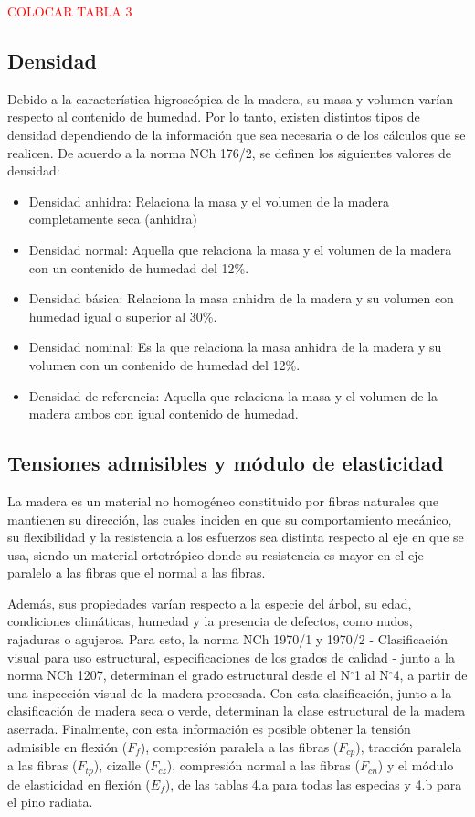 \textcolor{red}{COLOCAR TABLA 3}\\

\subsection{Densidad}
Debido a la característica higroscópica de la madera, su masa y volumen varían respecto al contenido de humedad. Por lo tanto, existen distintos tipos de densidad dependiendo de la información que sea necesaria o de los cálculos que se realicen. De acuerdo a la norma NCh 176/2, se definen los siguientes valores de densidad:
\begin{itemize}
	\item Densidad anhidra: Relaciona la masa y el volumen de la madera completamente seca (anhidra)
	\item Densidad normal: Aquella que relaciona la masa y el volumen de la madera con un contenido de humedad del 12\%.
	\item Densidad básica: Relaciona la masa anhidra de la madera y su volumen con humedad igual o superior al 30\%.
	\item Densidad nominal: Es la que relaciona la masa anhidra de la madera y su volumen con un contenido de humedad del 12\%.
	\item Densidad de referencia: Aquella que relaciona la masa y el volumen de la madera ambos con igual contenido de humedad.
\end{itemize}

\subsection{Tensiones admisibles y módulo de elasticidad}
La madera es un material no homogéneo constituido por fibras naturales que mantienen su dirección, las cuales inciden en que su comportamiento mecánico, su flexibilidad y la resistencia a los esfuerzos sea distinta respecto al eje en que se usa, siendo un material ortotrópico donde su resistencia es mayor en el eje paralelo a las fibras que el normal a las fibras.

Además, sus propiedades varían respecto a la especie del árbol, su edad, condiciones climáticas, humedad y la presencia de defectos, como nudos, rajaduras o agujeros. Para esto, la norma NCh 1970/1 y 1970/2 - Clasificación visual para uso estructural, especificaciones de los grados de calidad - junto a la norma NCh 1207, determinan el grado estructural desde el N$^\circ$1 al N$^\circ$4, a partir de una inspección visual de la madera procesada. Con esta clasificación, junto a la clasificación de madera seca o verde, determinan la clase estructural de la madera aserrada. Finalmente, con esta información es posible obtener la tensión admisible en flexión ($F_f$), compresión paralela a las fibras ($F_{cp}$), tracción paralela a las fibras ($F_{tp}$), cizalle ($F_{cz}$), compresión normal a las fibras ($F_{cn}$) y el módulo de elasticidad en flexión ($E_f$), de las tablas 4.a para todas las especias y 4.b para el pino radiata.

